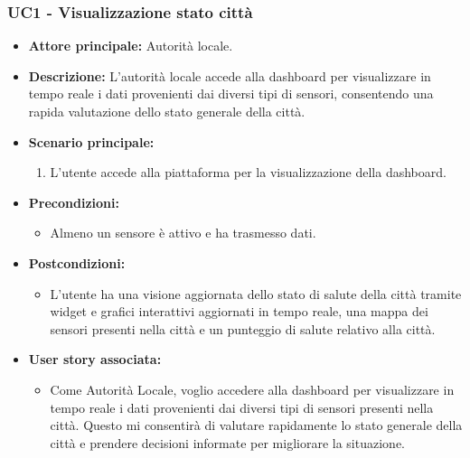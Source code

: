 \subsubsection{UC1 - Visualizzazione stato città}
\begin{itemize}
    \item \textbf{Attore principale:} Autorità locale.
    \item \textbf{Descrizione:} L'autorità locale accede alla dashboard per visualizzare in tempo reale i dati provenienti dai diversi tipi di sensori, consentendo una rapida valutazione dello stato generale della città.
    \item \textbf{Scenario principale:}
          \begin{enumerate}
              \item L'utente accede alla piattaforma per la visualizzazione della dashboard.
          \end{enumerate}
    \item \textbf{Precondizioni:}
          \begin{itemize}
              \item  Almeno un sensore è attivo e ha trasmesso dati.
          \end{itemize}
    \item \textbf{Postcondizioni:}
          \begin{itemize}
              \item      L'utente ha una visione aggiornata dello stato di salute della città tramite widget e grafici interattivi aggiornati in tempo reale, una mappa dei sensori presenti nella città e un punteggio di salute relativo alla città.
          \end{itemize}
    \item \textbf{User story associata:}
          \begin{itemize}
              \item Come Autorità Locale, voglio accedere alla dashboard per visualizzare in tempo reale i dati provenienti dai diversi tipi di sensori presenti nella città. Questo mi consentirà di valutare rapidamente lo stato generale della città e prendere decisioni informate per migliorare la situazione.
          \end{itemize}
\end{itemize}